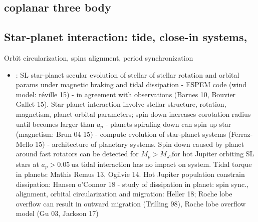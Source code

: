 \documentclass[main.tex]{subfiles}
\begin{document}
\subsection{coplanar three body}

\subsection{Star-planet interaction: tide, close-in systems, }
Orbit circularization, spins alignment, period synchronization
\begin{itemize}
    \item \cite{benbakoura2019evolution}: SL star-planet secular evolution of stellar of stellar rotation and orbital params under magnetic braking and tidal dissipation - ESPEM code (wind model: r\'eville 15) - in agreement with observations (Barnes 10, Bouvier Gallet 15). Star-planet interaction involve stellar structure, rotation, magnetism, planet orbital parameters; spin down increases corotation radius until becomes larger than $a_p$ - planets spiraling down can spin up star (magnetism: Brun 04 15) - compute evolution of star-planet systems (Ferraz-Mello 15) - architecture of planetary systems. Spin down caused by planet around fast rotators can be detected for $M_p>M_J$,for hot Jupiter orbiting SL stars at $a_p>\SI{0.05}{\astronomicalunit}$ tidal interaction has no impact on system. Tidal torque in planets: Mathis Remus 13, Ogilvie 14. Hot Jupiter population constrain dissipation: Hansen o'Connor 18 - study of dissipation in planet: spin sync., alignment, orbital circularization and migration: Heller 18; Roche lobe overflow can result in outward migration (Trilling 98), Roche lobe overflow model (Gu 03, Jackson 17)
\end{itemize}
\end{document}

